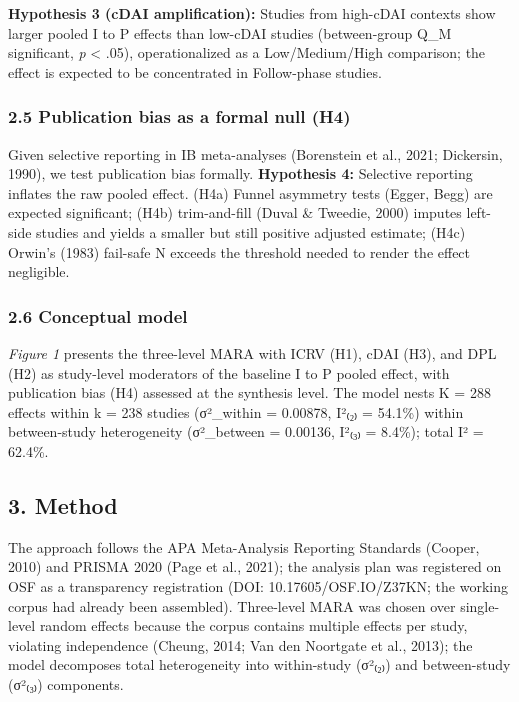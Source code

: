 \documentclass[
  12pt,a4paper]{article}
\begin{document}
\textbf{Hypothesis 3 (cDAI amplification):} Studies from high-cDAI
contexts show larger pooled I to P effects than low-cDAI studies
(between-group Q\_M significant, \emph{p} \textless{} .05),
operationalized as a Low/Medium/High comparison; the effect is expected
to be concentrated in Follow-phase studies.

\hypertarget{publication-bias-as-a-formal-null-h4}{%
\subsubsection{2.5 Publication bias as a formal null
(H4)}\label{publication-bias-as-a-formal-null-h4}}

Given selective reporting in IB meta-analyses (Borenstein et al., 2021;
Dickersin, 1990), we test publication bias formally. \textbf{Hypothesis
4:} Selective reporting inflates the raw pooled effect. (H4a) Funnel
asymmetry tests (Egger, Begg) are expected significant; (H4b)
trim-and-fill (Duval \& Tweedie, 2000) imputes left-side studies and
yields a smaller but still positive adjusted estimate; (H4c) Orwin's
(1983) fail-safe N exceeds the threshold needed to render the effect
negligible.

\hypertarget{conceptual-model}{%
\subsubsection{2.6 Conceptual model}\label{conceptual-model}}

\emph{Figure 1} presents the three-level MARA with ICRV (H1), cDAI (H3),
and DPL (H2) as study-level moderators of the baseline I to P pooled
effect, with publication bias (H4) assessed at the synthesis level. The
model nests K = 288 effects within k = 238 studies (σ²\_within =
0.00878, I²₍₂₎ = 54.1\%) within between-study heterogeneity (σ²\_between
= 0.00136, I²₍₃₎ = 8.4\%); total I² = 62.4\%.

\hypertarget{method}{%
\subsection{3. Method}\label{method}}

The approach follows the APA Meta-Analysis Reporting Standards (Cooper,
2010) and PRISMA 2020 (Page et al., 2021); the analysis plan was
registered on OSF as a transparency registration (DOI:
10.17605/OSF.IO/Z37KN; the working corpus had
already been assembled). Three-level MARA was chosen over single-level
random effects because the corpus contains multiple effects per study,
violating independence (Cheung, 2014; Van den Noortgate et al., 2013);
the model decomposes total heterogeneity into within-study (σ²₍₂₎) and
between-study (σ²₍₃₎) components.
\end{document}
